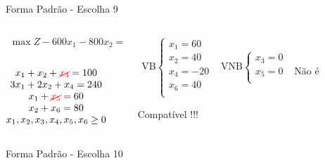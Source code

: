 \begin{frame}
{\begin{block}{Forma Padrão - {\color{cyan}Escolha 9}}
			\begin{columns}
				\begin{column}{0.35\textwidth}
					$
						\begin{matrix}
							\max Z - 600x_1 - 800x_2 = 0 \\
						\end{matrix}
					$ \\
					 \\
					$
						\begin{matrix}
							x_1  + x_2  + {\color{red}\cancel{x_3}}                   = 100 \\
							3x_1 + 2x_2       + x_4             = 240 \\
							x_1                     + {\color{red}\cancel{x_5}}       = 60 \\
							x_2                           + x_6 = 80 \\
							x_1,x_2, x_3, x_4, x_5, x_6 \ge 0 \\
						\end{matrix}
					$
				\end{column}
				\vline
				\hspace{0.1cm}
				\begin{column}{0.45\textwidth}
						$
							\begin{matrix}
								\text{VB} \left\{  \begin{matrix}
																 x_1 = 60 \\
																 x_2 = 40 \\
																 x_4 = -20 \\
																 x_6 = 40 \\
												   \end{matrix} 
										   \right.
								&
								\text{VNB} \left\{  \begin{matrix}
																 x_3 = 0 \\
																 x_5 = 0 \\
												   \end{matrix} 
										   \right. 
								\\
							 & \\
							\end{matrix}
						$
						{\color{red}Não é Compatível !!!}
				\end{column}
			\end{columns}
		\end{block}
	}
	{
		\begin{block}{Forma Padrão - {\color{cyan}Escolha 10}}

\end{block}}
\end{frame}
